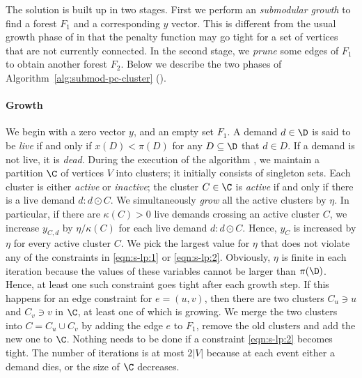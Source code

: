  

The solution is built up in two stages.
First we perform an \emph{submodular growth} to find a forest $F_1$ and a corresponding $y$ vector.
This is different from the usual growth phase of \cite{GW95, AKR91} in that
the penalty function may go tight for a set of vertices that are not currently connected.
In the second stage, we \emph{prune} some  edges of $F_1$ to obtain another forest $F_2$.
Below we describe the two phases of Algorithm~\ref{alg:submod-pc-cluster} ().



\paragraph{Growth}
 We begin with a zero vector $y$, and an empty set $F_1$.
 A demand $d\in\D$ is said to be \emph{live} if and only if
$x(D) < \pi(D)$ for any $D \subseteq \D$ that $d\in D$.  
If a demand is not live, it is \emph{dead}.
 During the execution of the algorithm , 
we maintain a partition $\C$ of vertices $V$ into clusters; 
it initially consists of singleton sets.
 Each cluster is either \emph{active} or \emph{inactive};
  the cluster $C\in\C$ is \emph{active} if and only if there is a live demand $d: d\odot C$.
We simultaneously \emph{grow} all the active clusters by $\eta$.
 In particular, if there are $\kappa(C)>0$ live demands crossing an active cluster $C$, 
we increase $y_{C,d}$ by $\eta/\kappa(C)$ for each live demand $d: d\odot C$.
 Hence, $y_{C}$ is increased by $\eta$ for every active cluster $C$.
 We pick the largest value for $\eta$ that does not violate any of the constraints in \eqref{eqn:s-lp:1} or \eqref{eqn:s-lp:2}.
 Obviously, $\eta$ is finite in each iteration because the 
values of these variables cannot be larger than $\pi(\D)$.
 Hence, at least one such constraint goes tight after each growth step.
 If this happens for an edge constraint for $e=(u,v)$,
 then there are two clusters $C_u\ni u$ and $C_v\ni v$ in $\C$,
 at least one of which is growing.
 We merge the two clusters into $C = C_u \cup C_v$ by adding the 
edge $e$ to $F_1$, remove the old clusters and add the new one to $\C$.
 Nothing needs to be done if a constraint \eqref{eqn:s-lp:2} becomes tight.
The number of iterations is at most $2|V|$ because at each 
event either a demand dies, or the size of $\C$ decreases.

